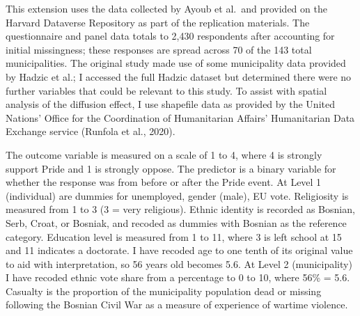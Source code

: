 \documentclass[
]{article}
\newenvironment{Shaded}{\begin{snugshade}}{\end{snugshade}}
\newcommand{\AttributeTok}[1]{\textcolor[rgb]{0.77,0.63,0.00}{#1}}
\newcommand{\CommentTok}[1]{\textcolor[rgb]{0.56,0.35,0.01}{\textit{#1}}}
\newcommand{\DecValTok}[1]{\textcolor[rgb]{0.00,0.00,0.81}{#1}}
\newcommand{\FunctionTok}[1]{\textcolor[rgb]{0.00,0.00,0.00}{#1}}
\newcommand{\NormalTok}[1]{#1}
\newcommand{\OtherTok}[1]{\textcolor[rgb]{0.56,0.35,0.01}{#1}}
\newcommand{\SpecialCharTok}[1]{\textcolor[rgb]{0.00,0.00,0.00}{#1}}
\newcommand{\StringTok}[1]{\textcolor[rgb]{0.31,0.60,0.02}{#1}}
\begin{document}
\begin{Shaded}
\end{Shaded}

This extension uses the data collected by Ayoub et al.~and provided on
the Harvard Dataverse Repository as part of the replication materials.
The questionnaire and panel data totals to 2,430 respondents after
accounting for initial missingness; these responses are spread across 70
of the 143 total municipalities. The original study made use of some
municipality data provided by Hadzic et al.; I accessed the full Hadzic
dataset but determined there were no further variables that could be
relevant to this study. To assist with spatial analysis of the diffusion
effect, I use shapefile data as provided by the United Nations' Office
for the Coordination of Humanitarian Affairs' Humanitarian Data Exchange
service (Runfola et al., 2020).

The outcome variable is measured on a scale of 1 to 4, where 4 is
strongly support Pride and 1 is strongly oppose. The predictor is a
binary variable for whether the response was from before or after the
Pride event. At Level 1 (individual) are dummies for unemployed, gender
(male), EU vote. Religiosity is measured from 1 to 3 (3 = very
religious). Ethnic identity is recorded as Bosnian, Serb, Croat, or
Bosniak, and recoded as dummies with Bosnian as the reference category.
Education level is measured from 1 to 11, where 3 is left school at 15
and 11 indicates a doctorate. I have recoded age to one tenth of its
original value to aid with interpretation, so 56 years old becomes 5.6.
At Level 2 (municipality) I have recoded ethnic vote share from a
percentage to 0 to 10, where 56\% = 5.6. Casualty is the proportion of
the municipality population dead or missing following the Bosnian Civil
War as a measure of experience of wartime violence.
\end{document}
